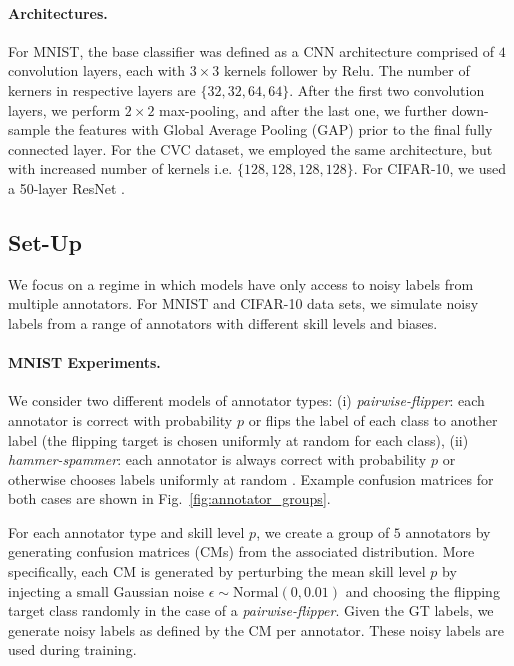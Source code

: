 \paragraph{Architectures. } For MNIST, the base classifier was defined as a CNN architecture comprised of $4$ convolution layers, each with $3\times3$ kernels follower by Relu. The number of kerners in respective layers are $\{32, 32, 64, 64\}$. After the first two convolution layers, we perform $2\times2$ max-pooling, and after the last one, we further down-sample the features with Global Average Pooling (GAP) prior to the final fully connected layer. For the CVC dataset, we employed the same architecture, but with increased number of kernels i.e. $\{128, 128, 128, 128\}$. For CIFAR-10, we used a 50-layer ResNet \cite{he2016deep}.



\subsection{Set-Up}
We focus on a regime in which models have only access to noisy labels from multiple annotators. For MNIST and CIFAR-10 data sets, we simulate noisy labels from a range of annotators with different skill levels and biases.

\paragraph{MNIST Experiments.} We consider two different models of annotator types: (i) \textit{pairwise-flipper}: each annotator is correct with probability $p$ or flips the label of each class to another label (the flipping target is chosen uniformly at random for each class), (ii) \textit{hammer-spammer}: each annotator is always correct with probability $p$ or otherwise chooses labels uniformly at random \cite{khetan2017learning}. Example confusion matrices for both cases are shown in Fig.~\ref{fig:annotator_groups}.

For each annotator type and skill level $p$, we create a group of $5$ annotators by generating confusion matrices (CMs) from the associated distribution. More specifically, each CM is generated by perturbing the mean skill level $p$ by injecting a small Gaussian noise $\epsilon \sim \text{Normal}(0, 0.01)$ and choosing the flipping target class randomly in the case of a \textit{pairwise-flipper}. Given the GT labels, we generate noisy labels as defined by the CM per annotator. These noisy labels are used during training.


